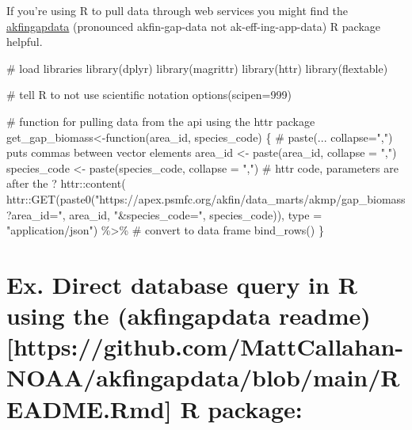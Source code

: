 \documentclass[
  letterpaper,
  oneside,
  open=any]{scrbook}
\newenvironment{Shaded}{\begin{snugshade}}{\end{snugshade}}
\newcommand{\AttributeTok}[1]{\textcolor[rgb]{0.40,0.45,0.13}{#1}}
\newcommand{\CommentTok}[1]{\textcolor[rgb]{0.37,0.37,0.37}{#1}}
\newcommand{\ControlFlowTok}[1]{\textcolor[rgb]{0.00,0.23,0.31}{#1}}
\newcommand{\DecValTok}[1]{\textcolor[rgb]{0.68,0.00,0.00}{#1}}
\newcommand{\FunctionTok}[1]{\textcolor[rgb]{0.28,0.35,0.67}{#1}}
\newcommand{\NormalTok}[1]{\textcolor[rgb]{0.00,0.23,0.31}{#1}}
\newcommand{\OtherTok}[1]{\textcolor[rgb]{0.00,0.23,0.31}{#1}}
\newcommand{\SpecialCharTok}[1]{\textcolor[rgb]{0.37,0.37,0.37}{#1}}
\newcommand{\StringTok}[1]{\textcolor[rgb]{0.13,0.47,0.30}{#1}}
\begin{document}
If you're using R to pull data through web services you might find the
\href{https://github.com/MattCallahan-NOAA/akfingapdata/tree/main}{akfingapdata}
(pronounced akfin-gap-data not ak-eff-ing-app-data) R package helpful.

\begin{Shaded}
\begin{Highlighting}[]
\CommentTok{\# load libraries}
\FunctionTok{library}\NormalTok{(dplyr)}
\FunctionTok{library}\NormalTok{(magrittr)}
\FunctionTok{library}\NormalTok{(httr)}
\FunctionTok{library}\NormalTok{(flextable)}

\CommentTok{\# tell R to not use scientific notation}
\FunctionTok{options}\NormalTok{(}\AttributeTok{scipen=}\DecValTok{999}\NormalTok{)}

\CommentTok{\# function for pulling data from the api using the httr package}
\NormalTok{get\_gap\_biomass}\OtherTok{\textless{}{-}}\ControlFlowTok{function}\NormalTok{(area\_id, species\_code) \{}
  \CommentTok{\# paste(... collapse=",") puts commas between vector elements}
\NormalTok{  area\_id }\OtherTok{\textless{}{-}} \FunctionTok{paste}\NormalTok{(area\_id, }\AttributeTok{collapse =} \StringTok{","}\NormalTok{)}
\NormalTok{  species\_code }\OtherTok{\textless{}{-}} \FunctionTok{paste}\NormalTok{(species\_code, }\AttributeTok{collapse =} \StringTok{","}\NormalTok{)}
  \CommentTok{\# httr code, parameters are after the \textquotesingle{}?\textquotesingle{}}
\NormalTok{  httr}\SpecialCharTok{::}\FunctionTok{content}\NormalTok{(}
\NormalTok{    httr}\SpecialCharTok{::}\FunctionTok{GET}\NormalTok{(}\FunctionTok{paste0}\NormalTok{(}\StringTok{"https://apex.psmfc.org/akfin/data\_marts/akmp/gap\_biomass?area\_id="}\NormalTok{,}
\NormalTok{                     area\_id,}
                     \StringTok{"\&species\_code="}\NormalTok{,}
\NormalTok{                     species\_code)),}
    \AttributeTok{type =} \StringTok{"application/json"}\NormalTok{) }\SpecialCharTok{\%\textgreater{}\%}
    \CommentTok{\# convert to data frame}
    \FunctionTok{bind\_rows}\NormalTok{()}
\NormalTok{\}}
\end{Highlighting}
\end{Shaded}

\hypertarget{ex.-direct-database-query-in-r-using-the-akfingapdata-readmehttpsgithub.commattcallahan-noaaakfingapdatablobmainreadme.rmd-r-package}{%
\section{Ex. Direct database query in R using the (akfingapdata
readme){[}https://github.com/MattCallahan-NOAA/akfingapdata/blob/main/README.Rmd{]}
R
package:}\label{ex.-direct-database-query-in-r-using-the-akfingapdata-readmehttpsgithub.commattcallahan-noaaakfingapdatablobmainreadme.rmd-r-package}}
\end{document}
